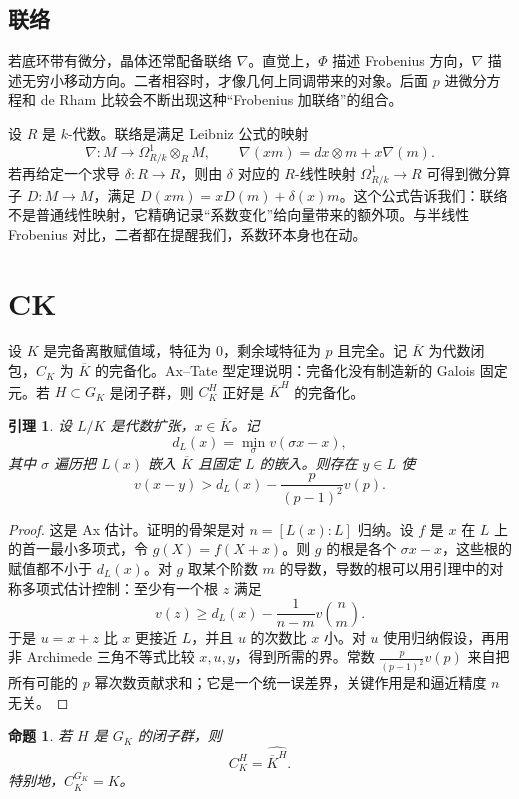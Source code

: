 \documentclass[11pt,a4paper,openany]{ctexbook}
\numberwithin{equation}{chapter}
\theoremstyle{plain}
\newtheorem{proposition}[theorem]{命题}
\newtheorem{lemma}[theorem]{引理}
\theoremstyle{definition}
\theoremstyle{remark}
\begin{document}
\subsection{联络}

若底环带有微分，晶体还常配备联络 $\nabla$。直觉上，$\Phi$ 描述 Frobenius 方向，$\nabla$ 描述无穷小移动方向。二者相容时，才像几何上同调带来的对象。后面 $p$ 进微分方程和 de Rham 比较会不断出现这种“Frobenius 加联络”的组合。

设 $R$ 是 $k$-代数。联络是满足 Leibniz 公式的映射
\[
  \nabla:M\longrightarrow \Omega^1_{R/k}\otimes_R M,\qquad
  \nabla(xm)=dx\otimes m+x\nabla(m).
\]
若再给定一个求导 $\delta:R\to R$，则由 $\delta$ 对应的 $R$-线性映射 $\Omega^1_{R/k}\to R$ 可得到微分算子 $D:M\to M$，满足 $D(xm)=xD(m)+\delta(x)m$。这个公式告诉我们：联络不是普通线性映射，它精确记录“系数变化”给向量带来的额外项。与半线性 Frobenius 对比，二者都在提醒我们，系数环本身也在动。

\section{CK}

设 $K$ 是完备离散赋值域，特征为 $0$，剩余域特征为 $p$ 且完全。记 $\overline K$ 为代数闭包，$C_K$ 为 $\overline K$ 的完备化。Ax--Tate 型定理说明：完备化没有制造新的 Galois 固定元。若 $H\subset G_K$ 是闭子群，则 $C_K^H$ 正好是 $\overline K^H$ 的完备化。

\begin{lemma}
设 $L/K$ 是代数扩张，$x\in\overline K$。记
\[
  d_L(x)=\min_{\sigma} v(\sigma x-x),
\]
其中 $\sigma$ 遍历把 $L(x)$ 嵌入 $\overline K$ 且固定 $L$ 的嵌入。则存在 $y\in L$ 使
\[
  v(x-y)>d_L(x)-\frac{p}{(p-1)^2}v(p).
\]
\end{lemma}

\begin{proof}
这是 Ax 估计。证明的骨架是对 $n=[L(x):L]$ 归纳。设 $f$ 是 $x$ 在 $L$ 上的首一最小多项式，令 $g(X)=f(X+x)$。则 $g$ 的根是各个 $\sigma x-x$，这些根的赋值都不小于 $d_L(x)$。对 $g$ 取某个阶数 $m$ 的导数，导数的根可以用引理中的对称多项式估计控制：至少有一个根 $z$ 满足
\[
  v(z)\ge d_L(x)-\frac{1}{n-m}v\binom nm .
\]
于是 $u=x+z$ 比 $x$ 更接近 $L$，并且 $u$ 的次数比 $x$ 小。对 $u$ 使用归纳假设，再用非 Archimede 三角不等式比较 $x,u,y$，得到所需的界。常数 $\frac{p}{(p-1)^2}v(p)$ 来自把所有可能的 $p$ 幂次数贡献求和；它是一个统一误差界，关键作用是和逼近精度 $n$ 无关。
\end{proof}

\begin{proposition}
若 $H$ 是 $G_K$ 的闭子群，则
\[
  C_K^H=\widehat{\overline K^H}.
\]
特别地，$C_K^{G_K}=K$。
\end{proposition}
\end{document}
